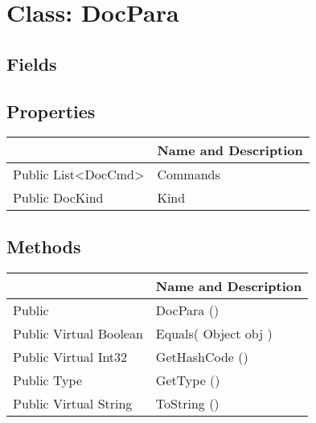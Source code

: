 \documentclass[11pt, oneside, a4paper]{book}
\begin{document}
\hypertarget{SoftwareEngineeringTools.{}Documentation.{}DocPara}{}
\section{Class: DocPara}

\subsection{Fields}

\subsection{Properties}
\begin{center}
\begin{tabular}{| p{3cm} | p{12cm} | }
\hline
\textbf{ } & \textbf{ Name and Description}\\
\hline
 Public  List<DocCmd> &  Commands\hypertarget{SoftwareEngineeringTools.{}Documentation.{}DocPara.{}Commands}{}\\
\hline
 Public  DocKind &  Kind\hypertarget{SoftwareEngineeringTools.{}Documentation.{}DocPara.{}Kind}{}\\
\hline
\end{tabular}
\end{center}

\subsection{Methods}
\begin{center}
\begin{tabular}{| p{3cm} | p{12cm} | }
\hline
\textbf{ } & \textbf{ Name and Description}\\
\hline
 Public  &  DocPara ()\hypertarget{SoftwareEngineeringTools.{}Documentation.{}DocPara.{}DocPara}{}\\
\hline
 Public  Virtual  Boolean &  Equals(\hypertarget{SoftwareEngineeringTools.{}Documentation.{}DocPara.{}Equals\_Object}{} Object  obj  )\\
\hline
 Public  Virtual  Int32 &  GetHashCode ()\hypertarget{SoftwareEngineeringTools.{}Documentation.{}DocPara.{}GetHashCode}{}\\
\hline
 Public  Type &  GetType ()\hypertarget{SoftwareEngineeringTools.{}Documentation.{}DocPara.{}GetType}{}\\
\hline
 Public  Virtual  String &  ToString ()\hypertarget{SoftwareEngineeringTools.{}Documentation.{}DocPara.{}ToString}{}\\
\hline
\end{tabular}
\end{center}
 
\end{document}
